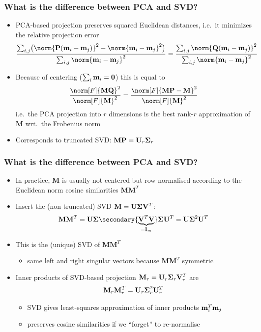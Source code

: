 \documentclass[t]{beamer} %
\begin{document}
\begin{frame}
  \frametitle{What is the difference between PCA and SVD?}

  \begin{itemize}
  \item PCA-based projection preserves squared Euclidean distances, i.e.\ it minimizes the relative projection error
    \[
      \frac{
        \sum_{i,j} \bigl( \norm{\mathbf{P}(\vm_i - \vm_j)}^2 - \norm{\vm_i - \vm_j}^2 \bigr)
      }{
        \sum_{i,j} \norm{\vm_i - \vm_j}^2
      }
      = \frac{
        \sum_{i,j} \norm{\mathbf{Q}(\vm_i - \vm_j)}^2
      }{
        \sum_{i,j} \norm{\vm_i - \vm_j}^2
      }
    \]
  \item<2-> Because of centering ($\sum_i \vm_i = \vnull$) this is equal to
    \[
      \frac{ \norm[F]{\mathbf{M}\mathbf{Q}}^2 }{ \norm[F]{\mathbf{M}}^2 }
      = \frac{ \norm[F]{\mathbf{M}\mathbf{P} - \mathbf{M}}^2 }{ \norm[F]{\mathbf{M}}^2 }
    \]
    i.e.\ the PCA projection into $r$ dimensions is the best rank-$r$ approximation of $\mathbf{M}$ wrt.\ the Frobenius norm
  \item<3-> Corresponds to truncated SVD: $\mathbf{M}\mathbf{P} = \mathbf{U}_r\boldsymbol{\Sigma}_r$
  \end{itemize}
\end{frame}

\begin{frame}
  \frametitle{What is the difference between PCA and SVD?}

  \begin{itemize}
  \item In practice, $\mathbf{M}$ is usually not centered but row-normalised according to the Euclidean norm \so cosine similarities $\mathbf{M} \mathbf{M}^T$
  \item<2-> Insert the (non-truncated) SVD $\mathbf{M} = \mathbf{U} \boldsymbol{\Sigma} \mathbf{V}^T$:
    \[
      \mathbf{M} \mathbf{M}^T
      = \mathbf{U} \Msigma \secondary{\underbrace{\mathbf{V}^T \mathbf{V}}_{= \mathbf{I}_m}} \Msigma \mathbf{U}^T
      = \mathbf{U} \Msigma^2 \mathbf{U}^T
    \]
  \item<3-> This is the (unique) SVD of $\mathbf{M} \mathbf{M}^T$
    \begin{itemize}
    \item[\hand] same left and right singular vectors because $\mathbf{M} \mathbf{M}^T$ symmetric
    \end{itemize}
  \item<4-> Inner products of SVD-based projection $\mathbf{M}_r = \mathbf{U}_r \boldsymbol{\Sigma}_r \mathbf{V}^T_r$ are
    \[
      \mathbf{M}_r \mathbf{M}^T_r = \mathbf{U}_r \boldsymbol{\Sigma}^2_r \mathbf{U}^T_r
    \]
    \ungap[1]
    \begin{itemize}
    \item[\So] SVD gives least-squares approximation of inner products $\vm_i^T \vm_j$
    \item[\So] preserves cosine similarities if we ``forget'' to re-normalise
    \end{itemize}
  \end{itemize}
\end{frame}
\end{document}
